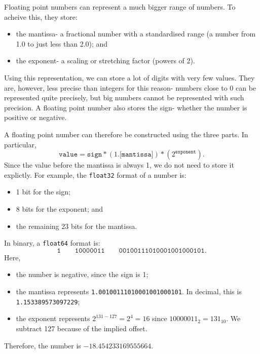 \documentclass[a4paper, openany]{memoir}
\begin{document}
    Floating point numbers can represent a much bigger range of numbers. To acheive this, they store:
    \begin{itemize}
        \item the mantissa- a fractional number with a standardised range (a number from 1.0 to just less than 2.0); and
        \item the exponent- a scaling or stretching factor (powers of 2).
    \end{itemize}
    Using this representation, we can store a lot of digits with very few values. They are, however, less precise than integers for this reason- numbers close to 0 can be represented quite precisely, but big numbers cannot be represented with such precision. A floating point number also stores the sign- whether the number is positive or negative.

    A floating point number can therefore be constructed using the three parts. In particular,
    \[\texttt{value} = \texttt{sign} * (1.\texttt{[mantissa]}) * (2^{\texttt{exponent}}).\]
    Since the value before the mantissa is always 1, we do not need to store it explictly. For example, the \texttt{float32} format of a number is:
    \begin{itemize}
        \item 1 bit for the sign;
        \item 8 bits for the exponent; and
        \item the remaining 23 bits for the mantissa.
    \end{itemize}
    In binary, a \texttt{float64} format is:
    \[\texttt{1} \qquad \texttt{10000011} \qquad \texttt{00100111010001001000101}.\]
    Here,
    \begin{itemize}
        \item the number is negative, since the sign is 1;
        \item the mantissa represents \texttt{1.00100111010001001000101}. In decimal, this is \texttt{1.153389573097229};
        \item the exponent represents $2^{131 - 127} = 2^4 = 16$ since $10000011_2 = 131_{10}$. We subtract 127 because of the implied offset.
    \end{itemize}
    Therefore, the number is $-18.454233169555664$.
\end{document}
